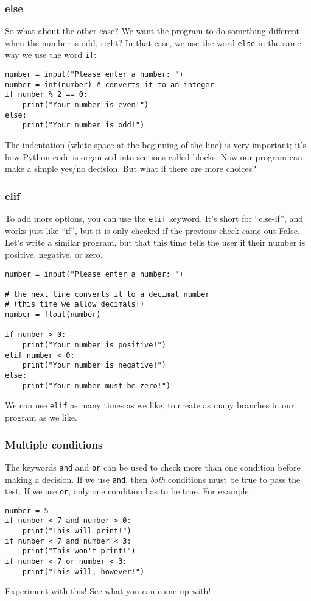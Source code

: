 \documentclass[a4paper]{article}
\begin{document}
\subsubsection{else}

So what about the other case? We want the program to do something different when the number is odd, right? In that case, we use the word \verb|else| in the same way we use the word \verb|if|:
\begin{lstlisting}
number = input("Please enter a number: ")
number = int(number) # converts it to an integer
if number % 2 == 0:
    print("Your number is even!")
else:
    print("Your number is odd!")
\end{lstlisting}
The indentation (white space at the beginning of the line) is very important; it's how Python code is organized into sections called blocks. Now our program can make a simple yes/no decision. But what if there are more choices?

\subsubsection{elif}

To add more options, you can use the \verb|elif| keyword. It's short for ``else-if'', and works just like ``if'', but it is only checked if the previous check came out False. Let's write a similar program, but that this time tells the user if their number is positive, negative, or zero.
\begin{lstlisting}
number = input("Please enter a number: ")

# the next line converts it to a decimal number
# (this time we allow decimals!)
number = float(number)

if number > 0:
    print("Your number is positive!")
elif number < 0:
    print("Your number is negative!")
else:
    print("Your number must be zero!")
\end{lstlisting}
We can use \verb|elif| as many times as we like, to create as many branches in our program as we like.

\subsubsection{Multiple conditions}

The keywords \verb|and| and \verb|or| can be used to check more than one condition before making a decision. If we use \verb|and|, then \emph{both} conditions must be true to pass the test. If we use \verb|or|, only one condition has to be true. For example:
\begin{lstlisting}
number = 5
if number < 7 and number > 0:
    print("This will print!")
if number < 7 and number < 3:
    print("This won't print!")
if number < 7 or number < 3:
    print("This will, however!")
\end{lstlisting}
Experiment with this! See what you can come up with!
\end{document}
